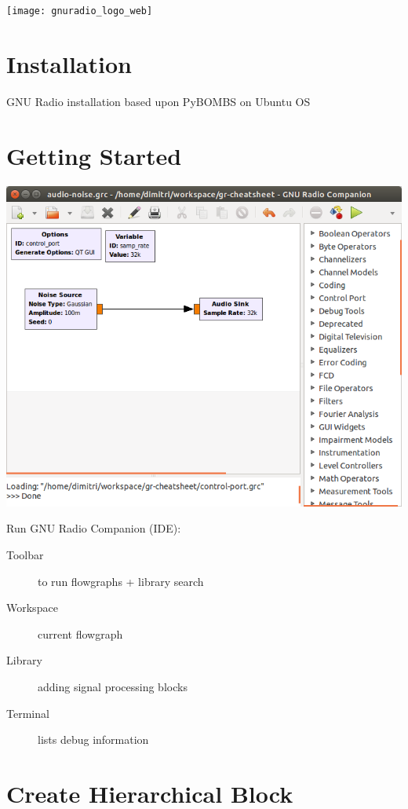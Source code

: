 \documentclass[10pt]{article}
\begin{document}
\texttt{[image: gnuradio\_logo\_web]}


\begin{multicols*}{3}


\section*{Installation}
GNU Radio installation based upon PyBOMBS on Ubuntu OS


\section*{Getting Started}

\includegraphics[width=0.99\linewidth]{./grc-screenshot}

Run GNU Radio Companion (IDE):
\begin{description}
\item[Toolbar] to run flowgraphs + library search
\item[Workspace] current flowgraph
\item[Library] adding signal processing blocks
\item[Terminal] lists debug information
\end{description}

\section*{Create Hierarchical Block}


\end{multicols*}
\end{document}
